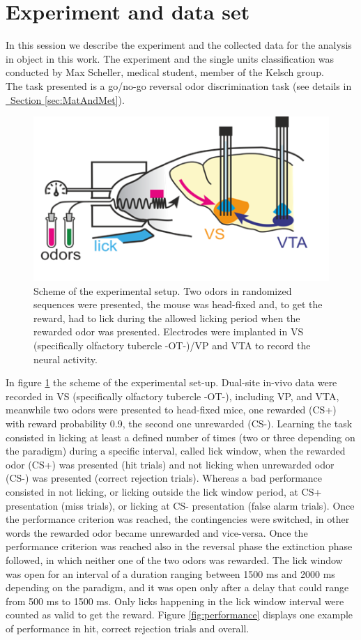 \section{Experiment and data set}
\label{sec:Dataset}
In this session we describe the experiment and the collected data for the analysis in object in this work. The experiment and the single units classification was conducted by Max Scheller, medical student, member of the Kelsch group.\\The task presented is a go/no-go reversal odor discrimination task (see details in \hyperref[sec:MatAndMet]{~Section \ref*{sec:MatAndMet}}).
\begin{figure}[H]
    \centering
    \includegraphics[scale=0.92]{figures/Experiment.png}
    \caption{Scheme of the experimental setup. Two odors in randomized sequences were presented, the mouse was head-fixed and, to get the reward, had to lick during the allowed licking period when the rewarded odor was presented. Electrodes were implanted in VS (specifically olfactory tubercle -OT-)/VP  and VTA to record the neural activity.}
    \label{fig:experiment}
\end{figure}
In figure \ref{fig:experiment} the scheme of the experimental set-up. Dual-site in-vivo data were recorded in VS (specifically olfactory tubercle -OT-), including VP, and VTA, meanwhile two odors were presented to head-fixed mice, one rewarded (CS+) with reward probability 0.9, the second one unrewarded (CS-). Learning the task consisted in licking at least a defined number of times (two or three depending on the paradigm) during a specific interval, called lick window, when the rewarded odor (CS+) was presented (hit trials) and not licking when unrewarded odor (CS-) was presented (correct rejection trials). Whereas a bad performance consisted in not licking, or licking outside the lick window period, at CS+ presentation (miss trials), or licking at CS- presentation (false alarm trials). Once the performance criterion was reached, the contingencies were switched, in other words the rewarded odor became unrewarded and vice-versa. Once the performance criterion was reached also in the reversal phase the extinction phase followed, in which neither one of the two odors was rewarded. The lick window was open for an interval of a duration ranging between 1500 ms and 2000 ms depending on the paradigm, and it was open only after a delay that could range from 500 ms to 1500 ms. Only licks happening in the lick window interval were counted as valid to get the reward. Figure \ref{fig:performance} displays one example of performance in hit, correct rejection trials and overall.
